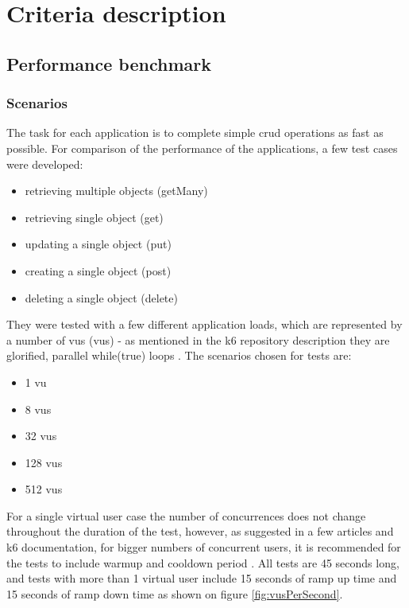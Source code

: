 
\chapter{Criteria description}

\section{Performance benchmark}

\subsection{Scenarios}\label{sub:scenarios}
The task for each application is to complete simple \acrshort{crud} operations as fast as possible. For comparison of the performance of the applications, a few test cases were developed:

\begin{itemize}
    \item retrieving multiple objects (getMany)
    \item retrieving single object (get)
    \item updating a single object (put)
    \item creating a single object (post)
    \item deleting a single object (delete)
\end{itemize}

They were tested with a few different application loads, which are represented by a number of \acrlong{vu}s (\acrshort{vu}s) - as mentioned in the k6 repository description they are glorified, parallel while(true) loops \cite{k6Git}.
The scenarios chosen for tests are:
\begin{itemize}
    \item 1 \acrshort{vu}
    \item 8 \acrshort{vu}s
    \item 32 \acrshort{vu}s
    \item 128 \acrshort{vu}s
    \item 512 \acrshort{vu}s
\end{itemize}
For a single virtual user case the number of concurrences does not change throughout the duration of the test, however, as suggested in a few articles and k6 documentation, for bigger numbers of concurrent users, it is recommended for the tests to include warmup and cooldown period \cite{whyRampUp} \cite{importanceOfRampUp} \cite{k6LoadTesting}. All tests are 45 seconds long, and tests with more than 1 virtual user include 15 seconds of ramp up time and 15 seconds of ramp down time as shown on figure \ref{fig:vusPerSecond}.

